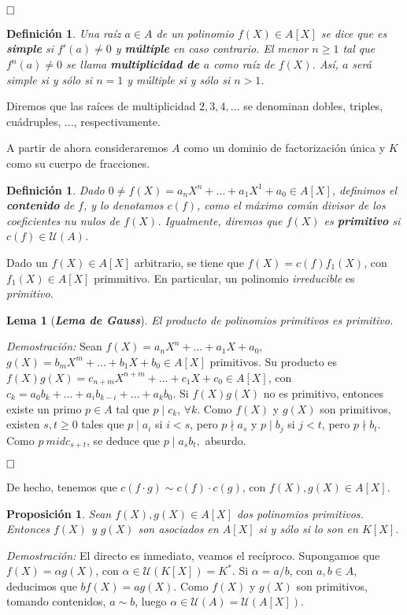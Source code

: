 \documentclass[12pt]{article}
\newtheorem{proposition}[theorem]{Proposición}
\newtheorem{lemma}{Lema}[theorem]
\newtheorem{definition}[theorem]{Definición}
\begin{document}
$\hfill \square$

\begin{definition}Una raíz $a \in A$ de un polinomio $f(X) \in A[X]$ se dice que es \textbf{simple} si $f'(a) \neq 0$ y \textbf{múltiple} en caso contrario. El menor $n \geq 1$ tal que $f^n(a) \neq 0$ se llama \textbf{multiplicidad de $a$} como raíz de $f(X)$. Así, $a$ será simple si y sólo si $n=1$ y múltiple si y sólo si $n > 1$.
\end{definition}

Diremos que las raíces de multiplicidad $2,3,4, \ldots$ se denominan dobles, triples, cuádruples, $\ldots$, respectivamente.

A partir de ahora consideraremos $A$ como un dominio de factorización única y $K$ como su cuerpo de fracciones.

\begin{definition}Dado $0 \neq f(X) = a_nX^n+ \ldots + a_1X^1+a_0 \in A[X]$, definimos el \textbf{contenido} de $f$, y lo denotamos $c(f)$, como el máximo común divisor de los coeficientes nu nulos de $f(X)$. Igualmente, diremos que $f(X)$ es \textbf{primitivo} si $c(f) \in \mathcal{U}(A)$.
\end{definition}

Dado un $f(X) \in A[X]$ arbitrario, se tiene que $f(X) = c(f)f_1(X)$, con $f_1(X) \in A[X]$ primmitivo. En particular, un polinomio \textit{irreducible} es \textit{primitivo}.

\begin{lemma}[\textbf{\textit{Lema de Gauss}}]El producto de polinomios primitivos es primitivo.
\end{lemma}
\emph{Demostración: }Sean $f(X) = a_nX^n+\ldots+ a_1X+a_0$, $g(X)= b_mX^m+\ldots+b_1X+b_0 \in A[X]$ primitivos. Su producto es $f(X)g(X) = c_{n+m}X^{n+m} + \ldots + c_1X+c_0 \in A[X]$, con $c_k = a_0b_k+ \ldots+ a_ib_{k-i} + \ldots + a_kb_0.$ Si $f(X)g(X)$ no es primitivo, entonces existe un primo $p \in A$ tal que $p \mid c_k$, $\forall k$. Como $f(X)$ y $g(X)$ son primitivos, existen $s,t \geq 0$ tales que $p \mid a_i$ si $i< s$, pero $p \nmid a_s$ y $p \mid b_j$ si $j <t$, pero $p \nmid b_t$. Como $p \ mid c_{s+t}$, se deduce que $p \mid a_sb_t,$ absurdo.

$\hfill \square$

De hecho, tenemos que $c(f\cdot g) \sim c(f)\cdot c(g)$, con $f(X), g(X) \in A[X]$.

\begin{proposition}Sean $f(X), g(X) \in A[X]$ dos polinomios primitivos. Entonces $f(X)$ y $g(X)$ son asociados en $A[X]$ si y sólo si lo son en $K[X]$.
\end{proposition}
\emph{Demostración: } El directo es inmediato, veamos el recíproco. Supongamos que $f(X) = \alpha g(X)$, con $\alpha \in \mathcal{U}(K[X]) = K^*$. Si $\alpha = a/b$, con $a,b \in A$, deducimos que $bf(X) = ag(X)$. Como $f(X)$ y $g(X)$ son primitivos, tomando contenidos, $a\sim b$, luego $\alpha \in \mathcal{U}(A) = \mathcal{U}(A[X])$.
\end{document}
